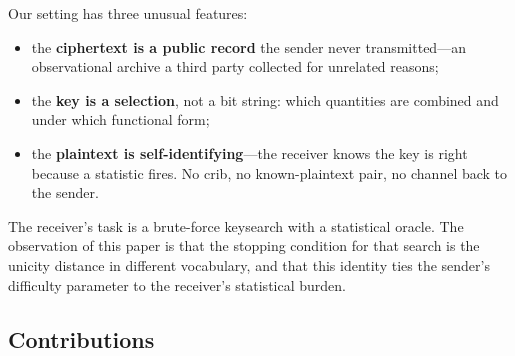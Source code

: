 Our setting has three unusual features:
\begin{itemize}
  \item the \textbf{ciphertext is a public record} the sender never
    transmitted---an observational archive a third party collected for unrelated
    reasons;
  \item the \textbf{key is a selection}, not a bit string: which quantities are
    combined and under which functional form;
  \item the \textbf{plaintext is self-identifying}---the receiver knows the key is
    right because a statistic fires. No crib, no known-plaintext pair, no channel
    back to the sender.
\end{itemize}

The receiver's task is a brute-force keysearch with a statistical oracle. The
observation of this paper is that the stopping condition for that search is the
unicity distance in different vocabulary, and that this identity ties the
sender's difficulty parameter to the receiver's statistical burden.

\subsection{Contributions}

